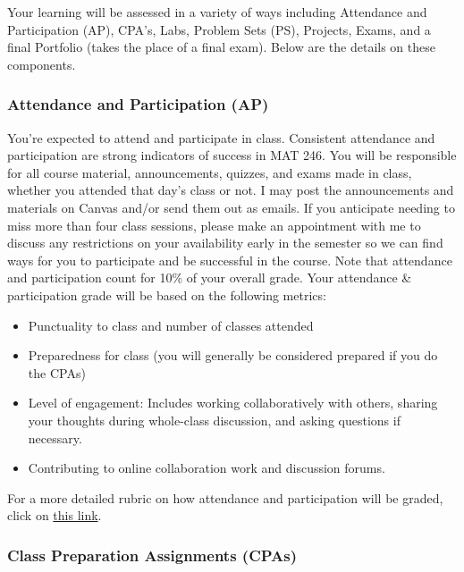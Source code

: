 \documentclass[
  letterpaper,
  DIV=11,
  numbers=noendperiod]{scrartcl}
\providecommand{\tightlist}{%
  \setlength{\itemsep}{0pt}\setlength{\parskip}{0pt}}\usepackage{longtable,booktabs,array}
\begin{document}
Your learning will be assessed in a variety of ways including Attendance
and Participation (AP), CPA's, Labs, Problem Sets (PS), Projects, Exams,
and a final Portfolio (takes the place of a final exam). Below are the
details on these components.

\subsubsection{Attendance and Participation
(AP)}\label{attendance-and-participation-ap}

You're expected to attend and participate in class. Consistent
attendance and participation are strong indicators of success in MAT
246. You will be responsible for all course material, announcements,
quizzes, and exams made in class, whether you attended that day's class
or not. I may post the announcements and materials on Canvas and/or send
them out as emails. If you anticipate needing to miss more than four
class sessions, please make an appointment with me to discuss any
restrictions on your availability early in the semester so we can find
ways for you to participate and be successful in the course. Note that
attendance and participation count for 10\% of your overall grade. Your
attendance \& participation grade will be based on the following
metrics:

\begin{itemize}
\tightlist
\item
  Punctuality to class and number of classes attended
\item
  Preparedness for class (you will generally be considered prepared if
  you do the CPAs)
\item
  Level of engagement: Includes working collaboratively with others,
  sharing your thoughts during whole-class discussion, and asking
  questions if necessary.
\item
  Contributing to online collaboration work and discussion forums.
\end{itemize}

For a more detailed rubric on how attendance and participation will be
graded, click on
\href{https://docs.google.com/document/d/1za7s6xJWr5EWzF3-LlHHL8Vyn2_dcfIa/edit}{this
link}.

\subsubsection{Class Preparation Assignments
(CPAs)}\label{class-preparation-assignments-cpas}
\end{document}
